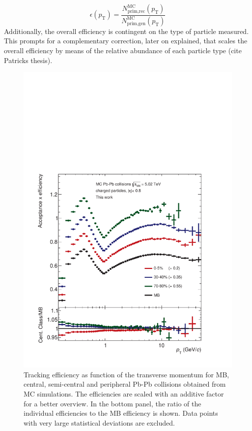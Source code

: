 \documentclass[12pt,a4paper]{report}
\begin{document}
\begin{equation}
\epsilon(p_\text{T}) = \dfrac{N_\text{prim,rec}^\text{MC}(p_\text{T})}{N_\text{prim,gen}^\text{MC}(p_\text{T})} 
\label{trckEffEq}
\end{equation}
Additionally, the overall efficiency is contingent on the type of particle measured. This prompts for a complementary correction, later on explained, that scales the overall efficiency by means of the relative abundance of each particle type (cite Patricks thesis).\\
\begin{figure}[tb!]
\centering
\includegraphics[width=12cm]{Plots/trckEffPbPb1.pdf}  
\caption{Tracking efficiency as function of the transverse momentum for MB, central, semi-central and peripheral Pb-Pb collisions obtained from MC simulations. The efficiencies are scaled with an additive factor for a better overview. In the bottom panel, the ratio of the individual efficiencies to the MB efficiency is shown. Data points with very large statistical deviations are excluded.}
\label{trckEffPbPb1}
\end{figure}
\end{document}
